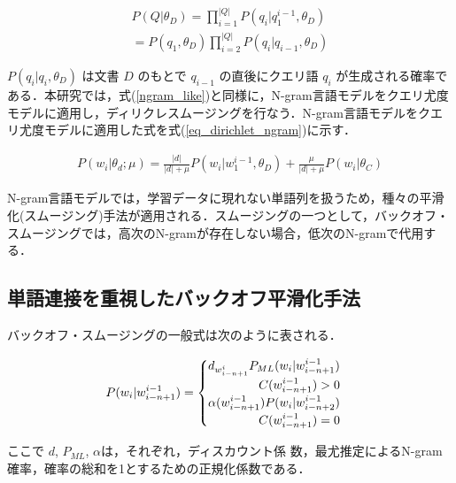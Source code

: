 \begin{equation}
\begin{split}
    P(Q|\theta_D) = \prod_{i=1}^{|Q|} P(q_i|q^{i-1}_{1}, \theta_D) \\
    = P(q_1, \theta_D) \prod_{i=2}^{|Q|} P(q_i|q_{i-1}, \theta_D)
    \label{ngram_like}
\end{split}
\end{equation}

$P(q_i|q_i, \theta_D)$ は文書 $D$ のもとで $q_{i-1}$ の直後にクエリ語 $q_i$ が生成される確率である．本研究では，式(\ref{ngram_like})と同様に，N-gram言語モデルをクエリ尤度モデルに適用し，ディリクレスムージングを行なう．N-gram言語モデルをクエリ尤度モデルに適用した式を式(\ref{eq_dirichlet_ngram})に示す．

\begin{equation}
\begin{split}
    P(w_i|\theta_d;\mu) = \frac{|d|}{|d|+\mu} P(w_i|w^{i-1}_{1}, \theta_D)
    + \frac{\mu}{|d|+\mu} P(w_i|\theta_C)  
    \label{eq_dirichlet_ngram}
\end{split}
\end{equation}

N-gram言語モデルでは，学習データに現れない単語列を扱うため，種々の平滑化(スムージング)手法が適用される．スムージングの一つとして，バックオフ・スムージングでは，高次のN-gramが存在しない場合，低次のN-gramで代用する．

\subsection{単語連接を重視したバックオフ平滑化手法}
バックオフ・スムージングの一般式は次のように表される．

\begin{equation}
		P(w_i|w_{i-n+1}^{i-1}) = 
    \begin{cases} 
        d_{w_{i-n+1}^i} P_{ML}(w_i|w_{i-n+1}^{i-1}) \\
        \hspace{\fill} C(w_{i-n+1}^{i-1}) > 0\\ 
        \alpha(w_{i-n+1}^{i-1})P(w_i|w_{i-n+2}^{i-1})\\ 
        \hspace{\fill} C(w_{i-n+1}^{i-1}) = 0
    \end{cases} 
    \label{ngram_smoosing1}
\end{equation}

ここで $d$, $P_{ML}$, $\alpha$は，それぞれ，ディスカウント係
数，最尤推定によるN-gram確率，確率の総和を1とするための正規化係数である．

